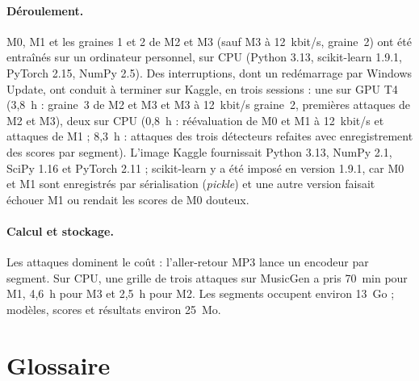 \documentclass[a4paper, 11pt]{article}
\begin{document}
\paragraph{Déroulement.} M0, M1 et les graines 1 et 2 de M2 et M3 (sauf M3 à 12~kbit/s, graine~2) ont été
entraînés sur un ordinateur personnel, sur CPU (Python 3.13, scikit-learn 1.9.1, PyTorch 2.15, NumPy 2.5).
Des interruptions, dont un redémarrage par Windows Update, ont conduit à terminer sur Kaggle, en trois
sessions : une sur GPU T4 (3,8~h : graine~3 de M2 et M3 et M3 à 12~kbit/s graine~2, premières attaques de M2
et M3), deux sur CPU (0,8~h : réévaluation de M0 et M1 à 12~kbit/s et attaques de M1 ; 8,3~h : attaques des
trois détecteurs refaites avec enregistrement des scores par segment). L'image Kaggle fournissait Python 3.13, NumPy 2.1, SciPy 1.16 et PyTorch 2.11 ;
scikit-learn y a été imposé en version 1.9.1, car M0 et M1 sont enregistrés par sérialisation
(\emph{pickle}) et une autre version faisait échouer M1 ou rendait les scores de M0 douteux.

\paragraph{Calcul et stockage.} Les attaques dominent le coût : l'aller-retour MP3 lance un encodeur par
segment. Sur CPU, une grille de trois attaques sur MusicGen a pris 70~min pour M1, 4,6~h pour M3 et 2,5~h
pour M2. Les segments occupent environ 13~Go ; modèles, scores et résultats environ 25~Mo.

\section{Glossaire}
\end{document}

